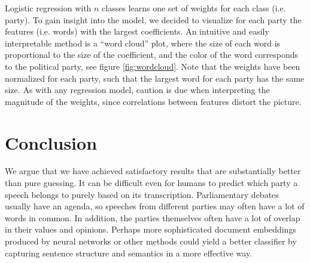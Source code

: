 \documentclass{article}
\begin{document}
Logistic regression with $n$ classes learns one set of weights for each class (i.e. party). To gain insight into the model, we decided to visualize for each party the features (i.e. words) with the largest coefficients. An intuitive and easily interpretable method is a “word cloud” plot, where the size of each word is proportional to the size of the coefficient, and the color of the word corresponds to the political party, see figure \ref{fig:wordcloud}. Note that the weights have been normalized for each party, such that the largest word for each party has the same size. As with any regression model, caution is due when interpreting the magnitude of the weights, since correlations between features distort the picture.

\section{Conclusion}
We argue that we have achieved satisfactory results that are substantially better than pure guessing. It can be difficult even for humans to predict which party a speech belongs to purely based on its transcription. Parliamentary debates usually have an agenda, so speeches from different parties may often have a lot of words in common. In addition, the parties themselves often have a lot of overlap in their values and opinions. Perhaps more sophisticated document embeddings produced by neural networks or other methods could yield a better classifier by capturing sentence structure and semantics in a more effective way.



\end{document}
